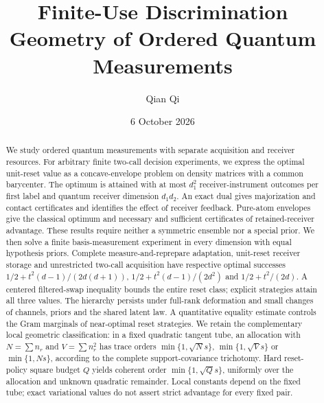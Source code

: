 \documentclass[11pt]{amsart}
\title[Finite-use discrimination geometry]{Finite-Use Discrimination Geometry of Ordered Quantum Measurements}
\author{Qian Qi}
\date{6 October 2026}
\numberwithin{equation}{section}
\theoremstyle{definition}\newtheorem{definition}[theorem]{Definition}
\theoremstyle{remark}\newtheorem{remark}[theorem]{Remark}
\begin{document}
\raggedbottom
\begin{abstract}
We study ordered quantum measurements with separate acquisition and
receiver resources.  For arbitrary finite two-call decision experiments,
we express the optimal unit-reset value as a concave-envelope problem
on density matrices with a common barycenter.  The optimum is attained
with at most $d_1^2$ receiver-instrument outcomes per first label and
quantum receiver dimension $d_1d_2$.  An exact dual gives majorization
and contact certificates and identifies the effect of receiver feedback.
Pure-atom envelopes give the classical optimum and necessary and
sufficient certificates of retained-receiver advantage.
These results require neither a symmetric ensemble nor a special prior.
We then solve a finite basis-measurement experiment in every dimension
with equal hypothesis priors.  Complete measure-and-reprepare adaptation,
unit-reset receiver storage and unrestricted two-call acquisition have
respective optimal successes $1/2+t^2(d-1)/(2d(d+1))$,
$1/2+t^2(d-1)/(2d^2)$ and $1/2+t^2/(2d)$.
A centered filtered-swap inequality bounds the entire reset class;
explicit strategies attain all three values.  The hierarchy persists
under full-rank deformation and small changes of channels, priors and
the shared latent law.  A quantitative equality estimate controls the
Gram marginals of near-optimal reset strategies.  We retain the complementary local geometric
classification: in a fixed quadratic tangent tube, an allocation with
$N=\sum n_r$ and $V=\sum n_r^2$ has trace orders
$\min\{1,\sqrt Ns\}$, $\min\{1,\sqrt Vs\}$ or $\min\{1,Ns\}$,
according to the complete support-covariance trichotomy.
Hard reset-policy square budget $Q$ yields coherent order
$\min\{1,\sqrt Qs\}$, uniformly over the allocation and unknown quadratic
remainder.  Local constants depend on the fixed tube; exact variational
values do not assert strict advantage for every fixed pair.
\end{abstract}
\maketitle



















\end{document}
